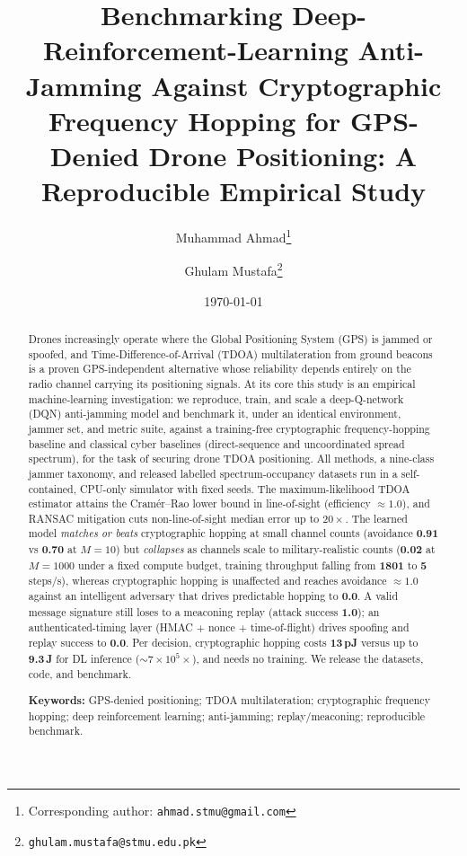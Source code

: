 \documentclass[11pt]{article}
\title{\bfseries Benchmarking Deep-Reinforcement-Learning Anti-Jamming Against
Cryptographic Frequency Hopping for GPS-Denied Drone Positioning:
A Reproducible Empirical Study}
\author[1]{Muhammad Ahmad\thanks{Corresponding author: \texttt{ahmad.stmu@gmail.com}}}
\author[1]{Ghulam Mustafa\thanks{\texttt{ghulam.mustafa@stmu.edu.pk}}}
\affil[1]{Department of Computing (Artificial Intelligence / Data Science),
Shifa Tameer-e-Millat University, Islamabad, Pakistan}
\date{\today}
\begin{document}
\maketitle

\begin{abstract}
\noindent Drones increasingly operate where the Global Positioning System (GPS)
is jammed or spoofed, and Time-Difference-of-Arrival (TDOA) multilateration from
ground beacons is a proven GPS-independent alternative whose reliability depends
entirely on the radio channel carrying its positioning signals. At its core this
study is an empirical machine-learning investigation: we reproduce, train, and
scale a deep-Q-network (DQN) anti-jamming model and benchmark it, under an
identical environment, jammer set, and metric suite, against a training-free
cryptographic frequency-hopping baseline and classical cyber baselines
(direct-sequence and uncoordinated spread spectrum), for the task of securing
drone TDOA positioning. All methods, a nine-class jammer taxonomy, and released
labelled spectrum-occupancy datasets run in a self-contained, CPU-only
simulator with fixed seeds. The maximum-likelihood TDOA estimator attains the
Cram\'er--Rao lower bound in line-of-sight (efficiency $\approx\!1.0$), and
RANSAC mitigation cuts non-line-of-sight median error up to $20\times$. The
learned model \emph{matches or beats} cryptographic hopping at small channel
counts (avoidance \textbf{0.91} vs \textbf{0.70} at $M{=}10$) but
\emph{collapses} as channels scale to military-realistic counts
(\textbf{0.02} at $M{=}1000$ under a fixed compute budget, training throughput
falling from \textbf{1801} to \textbf{5} steps/s), whereas cryptographic hopping
is unaffected and reaches avoidance $\approx\!1.0$ against an intelligent
adversary that drives predictable hopping to \textbf{0.0}. A valid message
signature still loses to a meaconing replay (attack success \textbf{1.0}); an
authenticated-timing layer (HMAC $+$ nonce $+$ time-of-flight) drives spoofing
and replay success to \textbf{0.0}. Per decision, cryptographic hopping costs
\textbf{13\,pJ} versus up to \textbf{9.3\,\textmu J} for DL inference
($\sim\!7\times10^{5}\times$), and needs no training. We release the datasets,
code, and benchmark.

\vspace{0.6em}
\noindent\textbf{Keywords:} GPS-denied positioning; TDOA multilateration;
cryptographic frequency hopping; deep reinforcement learning; anti-jamming;
replay/meaconing; reproducible benchmark.
\end{abstract}
\end{document}

